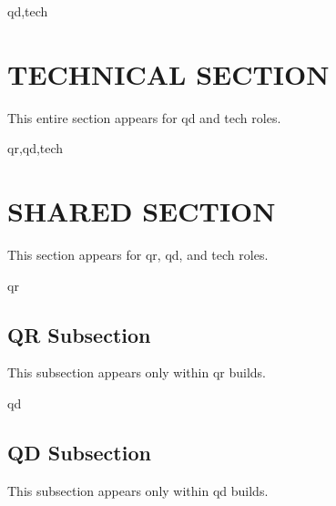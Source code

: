 \begin{rolecontent}{qd,tech}
\section{TECHNICAL SECTION}
This entire section appears for qd and tech roles.
\end{rolecontent}

\begin{rolecontent}{qr,qd,tech}
\section{SHARED SECTION}
This section appears for qr, qd, and tech roles.

\begin{rolecontent}{qr}
\subsection{QR Subsection}
This subsection appears only within qr builds.
\end{rolecontent}

\begin{rolecontent}{qd}
\subsection{QD Subsection}
This subsection appears only within qd builds.
\end{rolecontent}
\end{rolecontent} 
